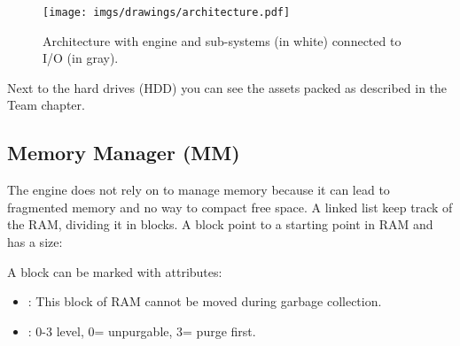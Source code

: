 \documentclass[book.tex]{subfiles}
\begin{document}
\begin{figure}[H]
\centering
\texttt{[image: imgs/drawings/architecture.pdf]}
\caption{Architecture with engine and sub-systems (in white) connected to I/O (in gray).}
\label{fig:architecture}
\end{figure}
Next to the hard drives (HDD) you can see the assets packed as described in the Team chapter.










\subsection{Memory Manager (MM)}
The engine does not rely on  to manage memory because it can lead to fragmented memory and no way to compact free space. A linked list keep track of the RAM, dividing it in blocks. A block
point to a starting point in RAM and has a size:\\
 \par

 \par
A block can be marked with attributes:
\begin{itemize}
\item {} : This block of RAM cannot be moved during garbage collection.
\item {} : 0-3 level, 0= unpurgable, 3= purge first.
\end{itemize}
\end{document}
